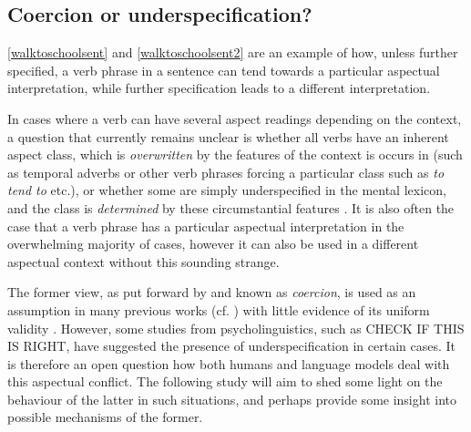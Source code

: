 \subsection{Coercion or underspecification?}
\label{sect:coerc_or_under}
\ref{walktoschoolsent} and \ref{walktoschoolsent2} are an example of how, unless further specified, a verb phrase in a sentence can tend towards a particular aspectual interpretation, while further specification leads to a different interpretation. 

In cases where a verb can have several aspect readings depending on the context, a question that currently remains unclear is whether all verbs have an inherent aspect class, which is \emph{overwritten} by the features of the context is occurs in (such as temporal adverbs or other verb phrases forcing a particular class such as \emph{to tend to} etc.), or whether some are simply underspecified in the mental lexicon, and the class is \emph{determined} by these circumstantial features \citep{https://doi.org/10.11588/huplc.2017.0.37820}. It is also often the case that a verb phrase has a particular aspectual interpretation in the overwhelming majority of cases, however it can also be used in a different aspectual context without this sounding strange.

The former view, as put forward by \citet{moens-steedman-1988-temporal} and known as \emph{coercion}, is used as an assumption in many previous works (cf. \citet{Swart+2019+321+349}) with little evidence of its uniform validity \citep{https://doi.org/10.11588/huplc.2017.0.37820}. However, some studies from psycholinguistics, such as \citet{semantic_processing_of_motion_verbs} CHECK IF THIS IS RIGHT, have suggested the presence of underspecification in certain cases. It is therefore an open question how both humans and language models deal with this aspectual conflict. The following study will aim to shed some light on the behaviour of the latter in such situations, and perhaps provide some insight into possible mechanisms of the former.